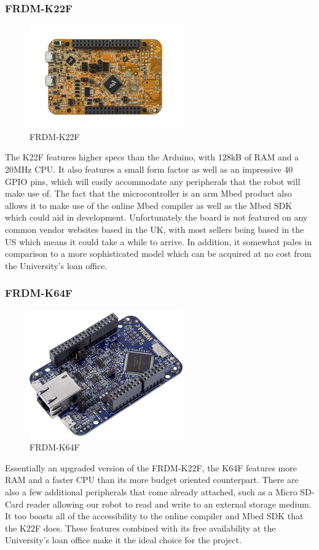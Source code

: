 					\subsubsection{FRDM-K22F}
					\begin{figure}[h]
						\centering
						\includegraphics[width=.3\linewidth]{ANALYSIS/k22f.png}
						\caption{FRDM-K22F}
						\label{fig:k22f}
					\end{figure}
					The K22F features higher specs than the Arduino, with 128kB of RAM and a 20MHz CPU. It also features a small form factor as well as an impressive 40 GPIO pins, which will easily accommodate any peripherals that the robot will make use of. The fact that the microcontroller is an arm Mbed product also allows it to make use of the online Mbed compiler as well as the Mbed SDK which could aid in development. Unfortunately the board is not featured on any common vendor websites based in the UK, with most sellers being based in the US which means it could take a while to arrive. In addition, it somewhat pales in comparison to a more sophisticated model which can be acquired at no cost from the University's loan office.
					
					\subsubsection{FRDM-K64F}
					\begin{figure}[h]
						\centering
						\includegraphics[width=.3\linewidth]{ANALYSIS/k64f.png}
						\caption{FRDM-K64F}
						\label{fig:k64f}
					\end{figure}
					Essentially an upgraded version of the FRDM-K22F, the K64F features more RAM and a faster CPU than its more budget oriented counterpart. There are also a few additional peripherals that come already attached, such as a Micro SD-Card reader allowing our robot to read and write to an external storage medium. It too boasts all of the accessibility to the online compiler and Mbed SDK that the K22F does. These features combined with its free availability at the University's loan office make it the ideal choice for the project.
			

